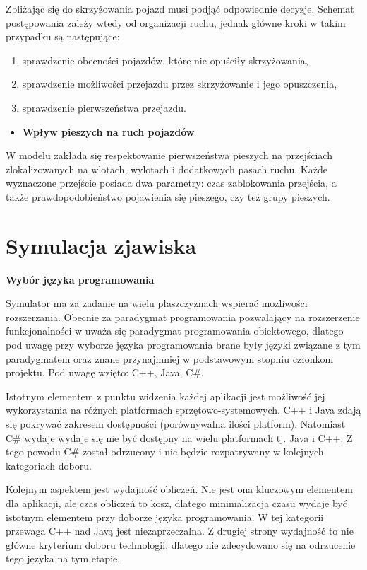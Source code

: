 \documentclass{sprawozdanie-agh}
\begin{document}
	Zbliżając się do skrzyżowania pojazd musi podjąć odpowiednie decyzje. Schemat postępowania zależy wtedy od organizacji ruchu, jednak główne kroki w takim przypadku są następujące:

	\begin{enumerate}
		\item sprawdzenie obecności pojazdów, które nie opuściły skrzyżowania,
		\item sprawdzenie możliwości przejazdu przez skrzyżowanie i jego opuszczenia,
		\item sprawdzenie pierwszeństwa przejazdu.
	\end{enumerate}

	\begin{itemize}
		\item{\textbf{Wpływ pieszych na ruch pojazdów}}
	\end{itemize}

	W modelu zakłada się respektowanie pierwszeństwa pieszych na przejściach zlokalizowanych na wlotach, wylotach i dodatkowych pasach ruchu. Każde wyznaczone przejście posiada dwa parametry: czas zablokowania przejścia, a także prawdopodobieństwo pojawienia się pieszego, czy też grupy pieszych.

	\section{Symulacja zjawiska}

	\textbf{\normalsize{Wybór języka programowania}}

	Symulator ma za zadanie na wielu płaszczyznach wspierać możliwości rozszerzania. Obecnie za paradygmat programowania pozwalający na rozszerzenie funkcjonalności w uważa się paradygmat programowania obiektowego, dlatego pod uwagę przy wyborze języka programowania brane były języki związane z tym paradygmatem oraz znane przynajmniej w podstawowym stopniu członkom projektu. Pod uwagę wzięto: C++, Java, C\#.

	Istotnym elementem z punktu widzenia każdej aplikacji jest możliwość jej wykorzystania na różnych platformach sprzętowo-systemowych. C++ i Java zdają się pokrywać zakresem dostępności (porównywalna ilości platform). Natomiast C\# wydaje wydaje się nie być dostępny na wielu platformach tj. Java i C++. Z tego powodu C\# został odrzucony i nie będzie rozpatrywany w kolejnych kategoriach doboru.

	Kolejnym aspektem jest wydajność obliczeń. Nie jest ona kluczowym elementem dla aplikacji, ale czas obliczeń to kosz, dlatego minimalizacja czasu wydaje być istotnym elementem przy doborze języka programowania. W tej kategorii przewaga C++ nad Javą jest niezaprzeczalna. Z drugiej strony wydajność to nie główne kryterium doboru technologii, dlatego nie zdecydowano się na odrzucenie tego języka na tym etapie.
\end{document}

